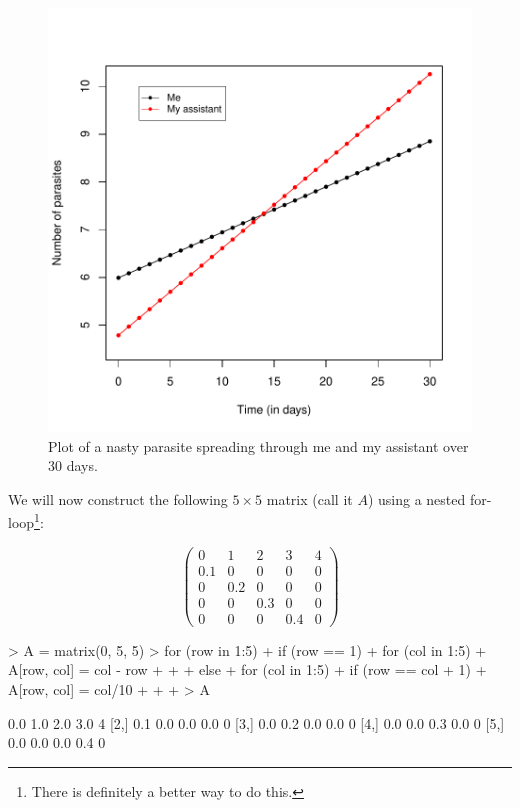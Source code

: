 \documentclass[11pt, oneside, reqno]{article}
\begin{document}
\begin{figure}
\begin{center}
\includegraphics{exercises-disease}
\end{center}
\caption{Plot of a nasty parasite spreading through me and my assistant over 30 days.}
\label{fig:disease}
\end{figure}

\eans



We will now construct the following $5\times 5$ matrix (call it $A$) using a nested for-loop\footnote{There is definitely a better way to do this.}:

\[
\begin{pmatrix}
0&1&2&3&4\\
0.1&0&0&0&0\\
0&0.2&0&0&0\\
0&0&0.3&0&0\\
0&0&0&0.4&0
\end{pmatrix}
\]


\begin{Schunk}
\begin{Sinput}
> A = matrix(0, 5, 5)
> for (row in 1:5) {
+     if (row == 1) {
+         for (col in 1:5) {
+             A[row, col] = col - row
+         }
+     }
+     else {
+         for (col in 1:5) {
+             if (row == col + 1) 
+                 A[row, col] = col/10
+         }
+     }
+ }
> A
\end{Sinput}
\begin{Soutput}
     [,1] [,2] [,3] [,4] [,5]
[1,]  0.0  1.0  2.0  3.0    4
[2,]  0.1  0.0  0.0  0.0    0
[3,]  0.0  0.2  0.0  0.0    0
[4,]  0.0  0.0  0.3  0.0    0
[5,]  0.0  0.0  0.0  0.4    0
\end{Soutput}
\end{Schunk}
\end{document}
